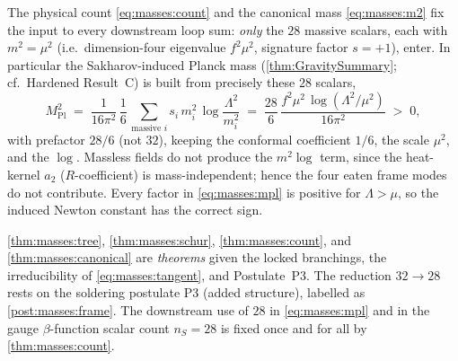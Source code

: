 The physical count \eqref{eq:masses:count} and the canonical mass
\eqref{eq:masses:m2} fix the input to every downstream loop sum: \emph{only}
the $28$ massive scalars, each with $m^{2}=\mu^{2}$ (i.e.\ dimension-four
eigenvalue $f^{2}\mu^{2}$, signature factor $s=+1$), enter. In particular the
Sakharov-induced Planck mass (\autoref{thm:GravitySummary}; cf.\ Hardened
Result~C) is built from precisely these $28$ scalars,
\begin{equation}\label{eq:masses:mpl}
  M_{\mathrm{Pl}}^{2}
  \;=\;
  \frac{1}{16\pi^{2}}\,\frac{1}{6}\,
  \sum_{\text{massive }i} s_{i}\,m_{i}^{2}\,\log\frac{\Lambda^{2}}{m_{i}^{2}}
  \;=\;
  \frac{28}{6}\,\frac{f^{2}\mu^{2}\,\log(\Lambda^{2}/\mu^{2})}{16\pi^{2}}
  \;>\;0,
\end{equation}
with prefactor $28/6$ (not $32$), keeping the conformal coefficient $1/6$, the
scale $\mu^{2}$, and the $\log$. Massless fields do not produce the $m^{2}\log$
term, since the heat-kernel $a_{2}$ ($R$-coefficient) is mass-independent;
hence the four eaten frame modes do not contribute. Every factor in
\eqref{eq:masses:mpl} is positive for $\Lambda>\mu$, so the induced Newton
constant has the correct sign.

\begin{remark}[Status]\label{rmk:masses:status}
\autoref{thm:masses:tree}, \autoref{thm:masses:schur},
\autoref{thm:masses:count}, and \autoref{thm:masses:canonical} are
\emph{theorems} given the locked branchings, the irreducibility of
\eqref{eq:masses:tangent}, and Postulate~P3. The reduction $32\to 28$ rests on
the soldering postulate P3 (added structure), labelled as
\autoref{post:masses:frame}. The downstream
use of $28$ in \eqref{eq:masses:mpl} and in the gauge $\beta$-function scalar
count $n_{S}=28$ is fixed once and for all by \autoref{thm:masses:count}.
\end{remark}
